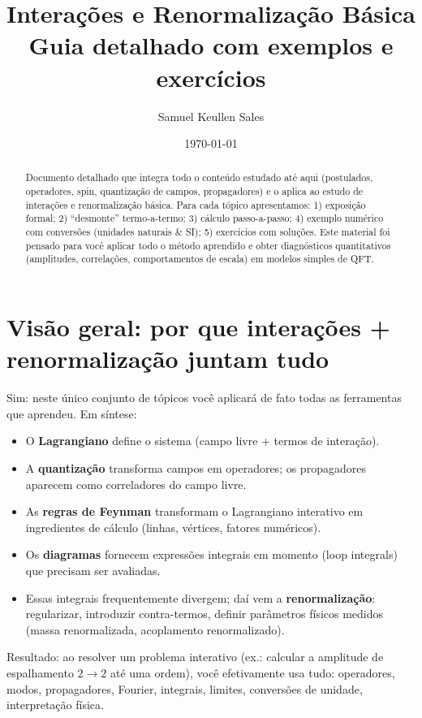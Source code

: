 \documentclass[12pt,a4paper]{article}
\title{Interações e Renormalização Básica\\\small{Guia detalhado com exemplos e exercícios}}
\author{Samuel Keullen Sales}
\date{\today}
\begin{document}
\maketitle

\begin{abstract}
Documento detalhado que integra todo o conteúdo estudado até aqui (postulados, operadores, spin, quantização de campos, propagadores) e o aplica ao estudo de interações e renormalização básica. Para cada tópico apresentamos: 1) exposição formal; 2) ``desmonte'' termo-a-termo; 3) cálculo passo-a-passo; 4) exemplo numérico com conversões (unidades naturais \& SI); 5) exercícios com soluções. Este material foi pensado para você aplicar todo o método aprendido e obter diagnósticos quantitativos (amplitudes, correlações, comportamentos de escala) em modelos simples de QFT.
\end{abstract}

\tableofcontents
\newpage

\section{Visão geral: por que interações + renormalização juntam tudo}
Sim: neste único conjunto de tópicos você aplicará de fato todas as ferramentas que aprendeu. Em síntese:
\begin{itemize}
\item O \textbf{Lagrangiano} define o sistema (campo livre + termos de interação).
\item A \textbf{quantização} transforma campos em operadores; os propagadores aparecem como correladores do campo livre.
\item As \textbf{regras de Feynman} transformam o Lagrangiano interativo em ingredientes de cálculo (linhas, vértices, fatores numéricos).
\item Os \textbf{diagramas} fornecem expressões integrais em momento (loop integrals) que precisam ser avaliadas.
\item Essas integrais frequentemente divergem; daí vem a \textbf{renormalização}: regularizar, introduzir contra-termos, definir parâmetros físicos medidos (massa renormalizada, acoplamento renormalizado).
\end{itemize}

Resultado: ao resolver um problema interativo (ex.: calcular a amplitude de espalhamento \(2\to2\) até uma ordem), você efetivamente usa tudo: operadores, modos, propagadores, Fourier, integrais, limites, conversões de unidade, interpretação física.
\end{document}
